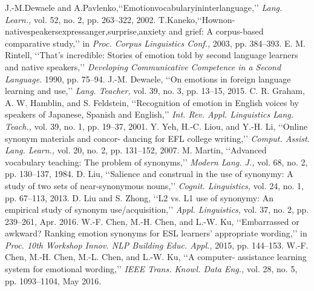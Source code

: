 \documentclass[a4paper,12pt,oneside]{article}
\begin{document}
\begin{thebibliography}{9}
 J.-M.Dewaele and A.Pavlenko,‘‘Emotionvocabularyininterlanguage,’’ \emph{Lang. Learn.,} vol. 52, no. 2, pp. 263–322, 2002.
 T.Kaneko,‘‘Hownon-nativespeakersexpressanger,surprise,anxiety and grief: A corpus-based comparative study,’’ in \emph{Proc. Corpus Linguistics Conf.,} 2003, pp. 384–393.
 E. M. Rintell, ‘‘That’s incredible: Stories of emotion told by second language learners and native speakers,’’ \emph{Developing Communicative Competence in a Second Language.} 1990, pp. 75–94.
 J.-M. Dewaele, ‘‘On emotions in foreign language learning and use,’’ \emph{Lang. Teacher,} vol. 39, no. 3, pp. 13–15, 2015.
 C. R. Graham, A. W. Hamblin, and S. Feldstein, ‘‘Recognition of emotion in English voices by speakers of Japanese, Spanish and English,’’ \emph{Int. Rev. Appl. Linguistics Lang. Teach.,} vol. 39, no. 1, pp. 19–37, 2001.
 Y. Yeh, H.-C. Liou, and Y.-H. Li, ‘‘Online synonym materials and concor- dancing for EFL college writing,’’ \emph{Comput. Assist. Lang. Learn.,} vol. 20, no. 2, pp. 131–152, 2007.
 M. Martin, ‘‘Advanced vocabulary teaching: The problem of synonyms,’’ \emph{Modern Lang. J.,} vol. 68, no. 2, pp. 130–137, 1984.
 D. Liu, ‘‘Salience and construal in the use of synonymy: A study of two sets of near-synonymous nouns,’’ \emph{Cognit. Linguistics,} vol. 24, no. 1, pp. 67–113, 2013.
 D. Liu and S. Zhong, ‘‘L2 vs. L1 use of synonymy: An empirical study of synonym use/acquisition,’’ \emph{Appl. Linguistics,} vol. 37, no. 2, pp. 239–261, Apr. 2016.
 W.-F. Chen, M.-H. Chen, and L.-W. Ku, ‘‘Embarrassed or awkward? Ranking emotion synonyms for ESL learners’ appropriate wording,’’ in \emph{Proc. 10th Workshop Innov. NLP Building Educ. Appl.,} 2015, pp. 144–153.
 W.-F. Chen, M.-H. Chen, M.-L. Chen, and L.-W. Ku, ‘‘A computer- assistance learning system for emotional wording,’’ \emph{IEEE Trans. Knowl. Data Eng.,} vol. 28, no. 5, pp. 1093–1104, May 2016.
\end{thebibliography}
\end{document}
